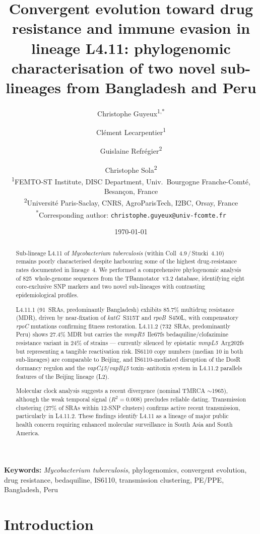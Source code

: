 \documentclass[11pt,a4paper]{article}
\title{Convergent evolution toward drug resistance and immune evasion in
       \mtb{} lineage L4.11: phylogenomic characterisation of two novel
       sub-lineages from Bangladesh and Peru}
\author{Christophe Guyeux\textsuperscript{1,*}
  \and Cl\'ement Lecarpentier\textsuperscript{1}
  \and Guislaine Refr\'egier\textsuperscript{2}
  \and Christophe Sola\textsuperscript{2}
  \\[6pt]
  {\normalsize\textsuperscript{1}FEMTO-ST Institute, DISC Department, Univ.\ Bourgogne Franche-Comt\'e, Besan\c{c}on, France}\\
  {\normalsize\textsuperscript{2}Universit\'e Paris-Saclay, CNRS, AgroParisTech, I2BC, Orsay, France}\\
  {\normalsize\textsuperscript{*}Corresponding author: \texttt{christophe.guyeux@univ-fcomte.fr}}
}
\date{\today}
\newcommand{\mtb}{\textit{Mycobacterium tuberculosis}}
\newcommand{\lignee}[1]{\textsf{#1}}
\begin{document}
\maketitle

\begin{abstract}
	Sub-lineage \lignee{L4.11} of \mtb{} (within Coll~4.9\,/\,Stucki~4.10) remains poorly characterised despite harbouring some of the highest drug-resistance rates documented in lineage~4. We performed a comprehensive phylogenomic analysis of 825~whole-genome sequences from the TBannotator~v3.2 database, identifying eight core-exclusive SNP markers and two novel sub-lineages with contrasting epidemiological profiles.

	\lignee{L4.11.1} (91~SRAs, predominantly Bangladesh) exhibits 85.7\% multidrug resistance (MDR), driven by near-fixation of \textit{katG}~S315T and \textit{rpoB}~S450L, with compensatory \textit{rpoC} mutations confirming fitness restoration. \lignee{L4.11.2} (732~SRAs, predominantly Peru) shows 27.4\% MDR but carries the \textit{mmpR5}~Ile67fs bedaquiline/clofazimine resistance variant in 24\% of strains --- currently silenced by epistatic \textit{mmpL5}~Arg202fs but representing a tangible reactivation risk. IS6110 copy numbers (median 10 in both sub-lineages) are comparable to Beijing, and IS6110-mediated disruption of the DosR dormancy regulon and the \textit{vapC45}/\textit{vapB45} toxin--antitoxin system in \lignee{L4.11.2} parallels features of the Beijing lineage (L2).

	Molecular clock analysis suggests a recent divergence (nominal TMRCA $\sim$1965), although the weak temporal signal ($R^2 = 0.008$) precludes reliable dating.  Transmission clustering (27\% of SRAs within 12-SNP clusters) confirms active recent transmission, particularly in \lignee{L4.11.2}. These findings identify \lignee{L4.11} as a lineage of major public health concern requiring enhanced molecular surveillance in South Asia and South America.
\end{abstract}

\noindent\textbf{Keywords:} \mtb, phylogenomics, convergent evolution, drug resistance,
bedaquiline, IS6110, transmission clustering, PE/PPE, Bangladesh, Peru

\section{Introduction}
\end{document}
